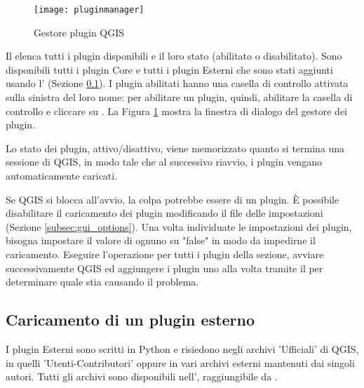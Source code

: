 \begin{figure}[ht]
   \centering
   \texttt{[image: pluginmanager]}
   \caption{Gestore plugin QGIS \nixcaption}\label{fig:pluginmanager}\smallskip
\end{figure}

Il  elenca tutti i plugin disponibili e il loro stato (abilitato o disabilitato).
Sono disponibili tutti i plugin Core e tutti i plugin Esterni che sono stati aggiunti usando 
l' (Sezione \ref{sec:load_external_plugin}).
I plugin abilitati hanno una casella di controllo attivata sulla sinistra del loro nome: 
per abilitare un plugin, quindi, abilitare la casella di controllo e cliccare su .
La Figura \ref{fig:pluginmanager} mostra la finestra di dialogo del gestore dei plugin.

Lo stato dei plugin, attivo/disattivo, viene memorizzato quanto si termina una sessione di QGIS, in modo tale 
che al successivo riavvio, i plugin vengano automaticamente caricati.

\begin{Tip}\caption{\textsc{Blocco dei plugin}}
Se QGIS si blocca all'avvio, la colpa potrebbe essere di un plugin. 
È possibile disabilitare il caricamento dei plugin modificando il file delle impostazioni 
(Sezione \ref{subsec:gui_options}). 
Una volta individuate le impostazioni dei plugin, bisogna impostare il valore di 
ognuno su "false" in modo da impedirne il caricamento.  \normalfont 
Eseguire l'operazione per tutti i plugin della sezione, avviare successivamente QGIS ed 
aggiungere i plugin uno alla volta tramite il  per determinare quale stia causando 
il problema.
\end{Tip}

\subsection{Caricamento di un plugin esterno}\label{sec:load_external_plugin} 

I plugin Esterni sono scritti in Python e risiedono negli archivi
'Ufficiali' di QGIS, in quelli 'Utenti-Contributori' oppure in vari archivi esterni 
mantenuti dai singoli autori. 
Tutti gli archivi sono disponibili nell', 
raggiungibile da
.

